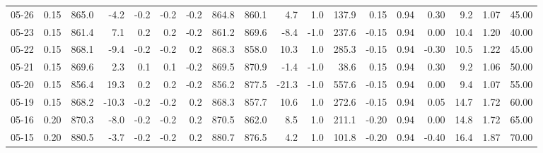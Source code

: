 \begin{threeparttable}
{\begin{tabular}{lrrrrrrrrrrrrrrrrr}
  05-26 &     0.15 & 865.0 &              -4.2 &              -0.2 &               -0.2 &               -0.2 & 864.8 & 860.1 &        4.7 &                      1.0 &               137.9 &       0.15 &      0.94 &           0.30 &              9.2 &            1.07 &                  45.00 \\
  05-23 &     0.15 & 861.4 &               7.1 &               0.2 &                0.2 &               -0.2 & 861.2 & 869.6 &       -8.4 &                     -1.0 &               237.6 &      -0.15 &      0.94 &           0.00 &             10.4 &            1.20 &                  40.00 \\
  05-22 &     0.15 & 868.1 &              -9.4 &              -0.2 &               -0.2 &                0.2 & 868.3 & 858.0 &       10.3 &                      1.0 &               285.3 &      -0.15 &      0.94 &          -0.30 &             10.5 &            1.22 &                  45.00 \\
  05-21 &     0.15 & 869.6 &               2.3 &               0.1 &                0.1 &               -0.2 & 869.5 & 870.9 &       -1.4 &                     -1.0 &                38.6 &       0.15 &      0.94 &           0.30 &              9.2 &            1.06 &                  50.00 \\
  05-20 &     0.15 & 856.4 &              19.3 &               0.2 &                0.2 &               -0.2 & 856.2 & 877.5 &      -21.3 &                     -1.0 &               557.6 &      -0.15 &      0.94 &           0.00 &              9.4 &            1.07 &                  55.00 \\
  05-19 &     0.15 & 868.2 &             -10.3 &              -0.2 &               -0.2 &                0.2 & 868.3 & 857.7 &       10.6 &                      1.0 &               272.6 &      -0.15 &      0.94 &           0.05 &             14.7 &            1.72 &                  60.00 \\
  05-16 &     0.20 & 870.3 &              -8.0 &              -0.2 &               -0.2 &                0.2 & 870.5 & 862.0 &        8.5 &                      1.0 &               211.1 &      -0.20 &      0.94 &           0.00 &             14.8 &            1.72 &                  65.00 \\
  05-15 &     0.20 & 880.5 &              -3.7 &              -0.2 &               -0.2 &                0.2 & 880.7 & 876.5 &        4.2 &                      1.0 &               101.8 &      -0.20 &      0.94 &          -0.40 &             16.4 &            1.87 &                  70.00 \\

\end{tabular}}
\end{threeparttable}
